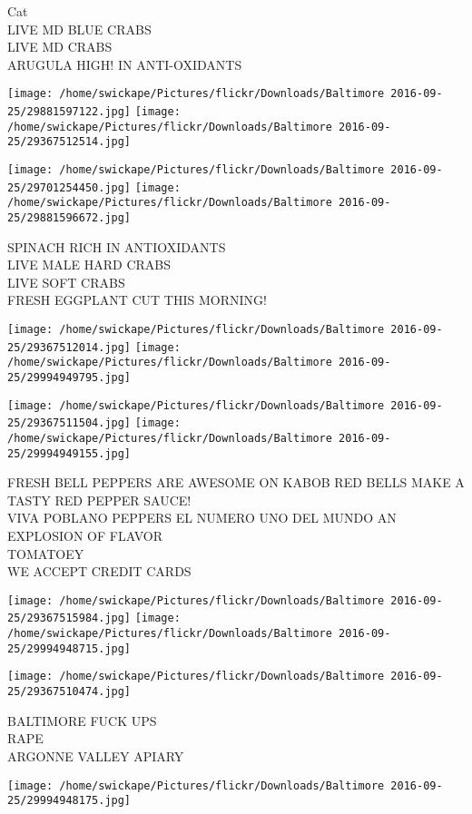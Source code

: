 \documentclass[10pt,letterpaper]{article}
\begin{document}
Cat\\
LIVE MD BLUE CRABS\\
LIVE MD CRABS\\
ARUGULA HIGH! IN ANTI{-}OXIDANTS
\pagebreak

\texttt{[image: /home/swickape/Pictures/flickr/Downloads/Baltimore 2016-09-25/29881597122.jpg]}
\texttt{[image: /home/swickape/Pictures/flickr/Downloads/Baltimore 2016-09-25/29367512514.jpg]}

\texttt{[image: /home/swickape/Pictures/flickr/Downloads/Baltimore 2016-09-25/29701254450.jpg]}
\texttt{[image: /home/swickape/Pictures/flickr/Downloads/Baltimore 2016-09-25/29881596672.jpg]}

SPINACH RICH IN ANTIOXIDANTS\\
LIVE MALE HARD CRABS\\
LIVE SOFT CRABS\\
FRESH EGGPLANT CUT THIS MORNING!
\pagebreak

\texttt{[image: /home/swickape/Pictures/flickr/Downloads/Baltimore 2016-09-25/29367512014.jpg]}
\texttt{[image: /home/swickape/Pictures/flickr/Downloads/Baltimore 2016-09-25/29994949795.jpg]}

\texttt{[image: /home/swickape/Pictures/flickr/Downloads/Baltimore 2016-09-25/29367511504.jpg]}
\texttt{[image: /home/swickape/Pictures/flickr/Downloads/Baltimore 2016-09-25/29994949155.jpg]}

FRESH BELL PEPPERS ARE AWESOME ON KABOB RED BELLS MAKE A TASTY RED PEPPER SAUCE!\\
VIVA POBLANO PEPPERS EL NUMERO UNO DEL MUNDO AN EXPLOSION OF FLAVOR\\
TOMATOEY\\
WE ACCEPT CREDIT CARDS
\pagebreak

\texttt{[image: /home/swickape/Pictures/flickr/Downloads/Baltimore 2016-09-25/29367515984.jpg]}
\texttt{[image: /home/swickape/Pictures/flickr/Downloads/Baltimore 2016-09-25/29994948715.jpg]}

\texttt{[image: /home/swickape/Pictures/flickr/Downloads/Baltimore 2016-09-25/29367510474.jpg]}

BALTIMORE FUCK UPS\\
RAPE\\
ARGONNE VALLEY APIARY
\pagebreak

\texttt{[image: /home/swickape/Pictures/flickr/Downloads/Baltimore 2016-09-25/29994948175.jpg]}
\end{document}
